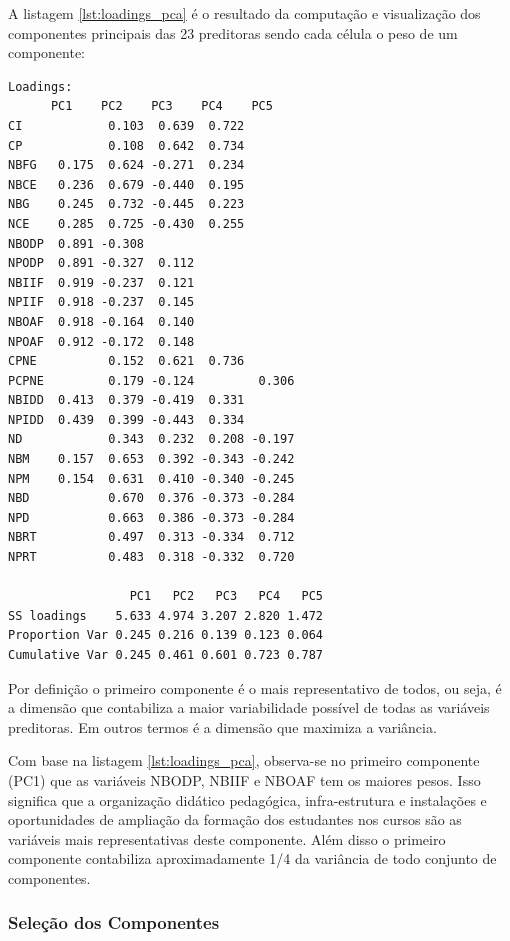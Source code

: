 A listagem \ref{lst:loadings_pca} é o resultado da computação e visualização dos componentes principais das 23 preditoras sendo cada célula o peso de um componente:
\pagebreak
\begin{lstlisting}[label={lst:loadings_pca}, captionpos=b, caption={Computação dos carregamentos da Análise do Componente Principal}]
Loadings:
      PC1    PC2    PC3    PC4    PC5   
CI            0.103  0.639  0.722       
CP            0.108  0.642  0.734       
NBFG   0.175  0.624 -0.271  0.234       
NBCE   0.236  0.679 -0.440  0.195       
NBG    0.245  0.732 -0.445  0.223       
NCE    0.285  0.725 -0.430  0.255       
NBODP  0.891 -0.308                     
NPODP  0.891 -0.327  0.112              
NBIIF  0.919 -0.237  0.121              
NPIIF  0.918 -0.237  0.145              
NBOAF  0.918 -0.164  0.140              
NPOAF  0.912 -0.172  0.148              
CPNE          0.152  0.621  0.736       
PCPNE         0.179 -0.124         0.306
NBIDD  0.413  0.379 -0.419  0.331       
NPIDD  0.439  0.399 -0.443  0.334       
ND            0.343  0.232  0.208 -0.197
NBM    0.157  0.653  0.392 -0.343 -0.242
NPM    0.154  0.631  0.410 -0.340 -0.245
NBD           0.670  0.376 -0.373 -0.284
NPD           0.663  0.386 -0.373 -0.284
NBRT          0.497  0.313 -0.334  0.712
NPRT          0.483  0.318 -0.332  0.720

                 PC1   PC2   PC3   PC4   PC5
SS loadings    5.633 4.974 3.207 2.820 1.472
Proportion Var 0.245 0.216 0.139 0.123 0.064
Cumulative Var 0.245 0.461 0.601 0.723 0.787
\end{lstlisting}

Por definição o primeiro componente é o mais representativo de todos, ou seja, é a dimensão que contabiliza a maior variabilidade possível de todas as variáveis preditoras. Em outros termos é a dimensão que maximiza a variância.

Com base na listagem \ref{lst:loadings_pca}, observa-se no primeiro componente (PC1) que as variáveis NBODP, NBIIF e NBOAF tem os maiores pesos. Isso significa que a organização didático pedagógica, infra-estrutura e instalações e oportunidades de ampliação da formação dos estudantes nos cursos são as variáveis mais representativas deste componente. Além disso o primeiro componente contabiliza aproximadamente 1/4 da variância de todo conjunto de componentes.

\subsubsection{Seleção dos Componentes}

